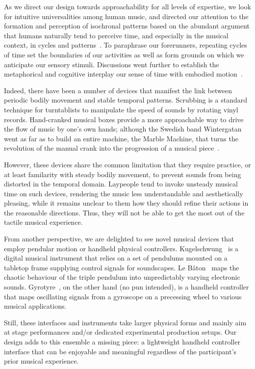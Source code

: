 \documentclass{nime-alternate} %
\begin{document}
As we direct our design towards approachability for all levels of expertise, we look for intuitive universalities among human music, and directed our attention to the formation and perception of isochronal patterns based on the abundant argument that humans naturally tend to perceive time, and especially in the musical context, in cycles and patterns~\cite{Brower:Cog, Neisser_1976, Ravignani2016}. To paraphrase our forerunners, repeating cycles of time set the boundaries of our activities as well as form grounds on which we anticipate our sensory stimuli. Discussions went further to establish the metaphorical and cognitive interplay our sense of time with embodied motion~\cite{Johnson_Larson_2003, Johnson_2008}.

Indeed, there have been a number of devices that manifest the link between periodic bodily movement and stable temporal patterns. Scrubbing is a standard technique for turntablists to manipulate the speed of sounds by rotating vinyl records. Hand-cranked musical boxes provide a more approachable way to drive the flow of music by one's own hands; although the Swedish band Wintergatan went as far as to build an entire machine, the Marble Machine, that turns the revolution of the manual crank into the progression of a musical piece~\cite{Rundle_Woollaston-Webber_2017}.

However, these devices share the common limitation that they require practice, or at least familarity with steady bodily movement, to prevent sounds from being distorted in the temporal domain. Laypeople tend to invoke unsteady musical time on such devices, rendering the music less understandable and aesthetically pleasing, while it remains unclear to them how they should refine their actions in the reasonable directions. Thus, they will not be able to get the most out of the tactile musical experience.

From another perspective, we are delighted to see novel musical devices that employ pendular motion or handheld physical controllers. Kugelschwung~\cite{Kugelschwung} is a digital musical instrument that relies on a set of pendulums mounted on a tabletop frame supplying control signals for soundscapes. Le Bâton~\cite{LeBaton} maps the chaotic behaviour of the triple pendulum into unpredictably varying electronic sounds. Gyrotyre~\cite{Gyrotyre}, on the other hand (no pun intended), is a handheld controller that maps oscillating signals from a gyroscope on a precessing wheel to various musical applications.

Still, these interfaces and instruments take larger physical forms and mainly aim at stage performances and/or dedicated experimental production setups. Our design adds to this ensemble a missing piece: a lightweight handheld controller interface that can be enjoyable and meaningful regardless of the participant's prior musical experience.
\end{document}

